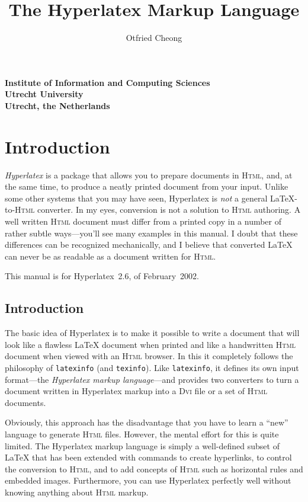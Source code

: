 \documentclass{article}
\title{The Hyperlatex Markup Language}
\author{Otfried Cheong}
\date{}
\newcommand{\+}{\verb+}
\renewcommand{\*}{\back{}}
\newcommand{\Html}{\textsc{Html}\xspace }
\newcommand{\latex}{\LaTeX\xspace }
\newcommand{\latexinfo}{\texttt{latexinfo}\xspace }
\newcommand{\texinfo}{\texttt{texinfo}\xspace }
\newcommand{\dvi}{\textsc{Dvi}\xspace }
\begin{document}
\maketitle
\begin{center}
  {\small\bf Institute of Information and Computing Sciences}\\[-0.7ex]
  {\small\bf Utrecht University}\\[-0.7ex]
  {\small\bf Utrecht, the Netherlands}
\end{center}

\T\section{Introduction}

\emph{Hyperlatex} is a package that allows you to prepare documents in
\Html, and, at the same time, to produce a neatly printed document
from your input. Unlike some other systems that you may have seen,
Hyperlatex is \emph{not} a general \latex-to-\Html converter.  In my
eyes, conversion is not a solution to \Html authoring.  A well written
\Html document must differ from a printed copy in a number of rather
subtle ways---you'll see many examples in this manual.  I doubt that
these differences can be recognized mechanically, and I believe that
converted \latex can never be as readable as a document written for
\Html.

This manual is for Hyperlatex~2.6, of February~2002.


\begin{ifhtml}
  \section{Introduction}
\end{ifhtml}

The basic idea of Hyperlatex is to make it possible to write a
document that will look like a flawless \latex document when printed
and like a handwritten \Html document when viewed with an \Html
browser. In this it completely follows the philosophy of \latexinfo
(and \texinfo).  Like \latexinfo, it defines its own input
format---the \emph{Hyperlatex markup language}---and provides two
converters to turn a document written in Hyperlatex markup into a \dvi
file or a set of \Html documents.

\label{philosophy}
Obviously, this approach has the disadvantage that you have to learn a
``new'' language to generate \Html files. However, the mental effort
for this is quite limited. The Hyperlatex markup language is simply a
well-defined subset of \latex that has been extended with commands to
create hyperlinks, to control the conversion to \Html, and to add
concepts of \Html such as horizontal rules and embedded images.
Furthermore, you can use Hyperlatex perfectly well without knowing
anything about \Html markup.
\end{document}
